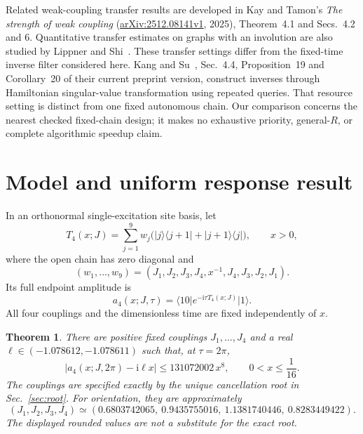 \documentclass[11pt,a4paper]{article}
\newcommand{\ii}{\mathrm{i}}
\newcommand{\ket}[1]{\lvert #1\rangle}
\newcommand{\bra}[1]{\langle #1\rvert}
\newtheorem{theorem}{Theorem}
\numberwithin{equation}{section}
\begin{document}
Related weak-coupling transfer results are developed in Kay and Tamon's
\emph{The strength of weak coupling}
(\href{https://arxiv.org/abs/2512.08141v1}{arXiv:2512.08141v1}, 2025),
Theorem~4.1 and Secs.~4.2 and 6. Quantitative transfer estimates on graphs with
an involution are also studied by Lippner and Shi~\cite{LippnerShi2024}.
These transfer settings differ from the fixed-time inverse filter considered
here. Kang and Su~\cite{KangSu2026}, Sec.~4.4, Proposition~19 and
Corollary~20 of their current preprint version, construct inverses through
Hamiltonian singular-value transformation using repeated queries. That
resource setting is distinct from one fixed autonomous chain. Our comparison
concerns the nearest checked fixed-chain design; it makes no exhaustive
priority, general-$R$, or complete algorithmic speedup claim.

\section{Model and uniform response result}
In an orthonormal single-excitation site basis, let
\begin{equation}
 T_4(x;J)=\sum_{j=1}^{9}w_j
 \bigl(\ket{j}\bra{j+1}+\ket{j+1}\bra{j}\bigr),
 \qquad x>0,
 \label{eq:chain}
\end{equation}
where the open chain has zero diagonal and
\begin{equation}
 (w_1,\ldots,w_9)=(J_1,J_2,J_3,J_4,x^{-1},J_4,J_3,J_2,J_1).
\end{equation}
Its full endpoint amplitude is
\begin{equation}
 a_4(x;J,\tau)=\bra{10}e^{-\ii\tau T_4(x;J)}\ket{1}.
 \label{eq:amplitude}
\end{equation}
All four couplings and the dimensionless time are fixed independently of $x$.

\begin{theorem}\label{thm:main}
There are positive fixed couplings $J_1,\ldots,J_4$ and a real
$\ell\in(-1.078612,-1.078611)$ such that, at $\tau=2\pi$,
\begin{equation}
 \bigl|a_4(x;J,2\pi)-\ii\ell x\bigr|
 \le 131072002\,x^8,\qquad 0<x\le\frac1{16}.
 \label{eq:uniform}
\end{equation}
The couplings are specified exactly by the unique cancellation root in
Sec.~\ref{sec:root}. For orientation, they are approximately
\begin{equation}
 (J_1,J_2,J_3,J_4)\simeq
 (0.6803742065,\ 0.9435755016,\ 1.1381740446,\ 0.8283449422).
 \label{eq:rounded}
\end{equation}
The displayed rounded values are not a substitute for the exact root.
\end{theorem}
\end{document}
